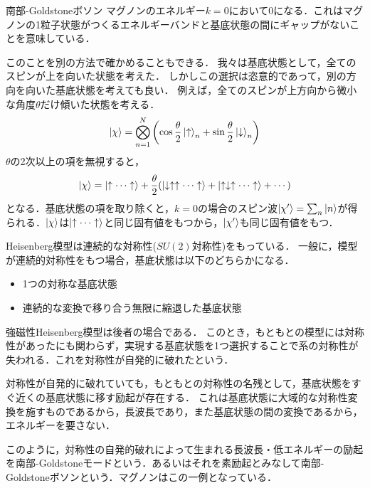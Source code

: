 \documentclass[../main.tex]{subfiles}
\begin{document}
\begin{frame}{南部-Goldstoneボソン}
    マグノンのエネルギー$k=0$において$0$になる．これはマグノンの1粒子状態がつくるエネルギーバンドと基底状態の間に\alert{ギャップがない}ことを意味している．

    このことを別の方法で確かめることもできる．
    我々は基底状態として，全てのスピンが上を向いた状態を考えた．
    しかしこの選択は恣意的であって，別の方向を向いた基底状態を考えても良い．
    例えば，全てのスピンが上方向から微小な角度$\theta$だけ傾いた状態を考える．
    \begin{align}
        \ket{\chi} = \bigotimes_{n=1}^N \qty(\cos\frac{\theta}{2}\ket{\uparrow}_n + \sin \frac{\theta}{2}\ket{\downarrow}_n)
    \end{align}
    $\theta$の2次以上の項を無視すると，
    \begin{align}
        \ket{\chi} = \ket{\uparrow\cdots\uparrow} + \frac{\theta}{2}\qty(\ket{\downarrow\uparrow\uparrow\cdots\uparrow}+ \ket{\uparrow\downarrow\uparrow\cdots\uparrow}+\cdots)
    \end{align}
    となる．基底状態の項を取り除くと，$k=0$の場合のスピン波$\ket{\chi'} = \sum_n \ket{n}$が得られる．$\ket{\chi}$は$\ket{\uparrow\cdots\uparrow}$と同じ固有値をもつから，$\ket{\chi'}$も同じ固有値をもつ．
\end{frame}

\begin{frame}
    Heisenberg模型は連続的な対称性($SU(2)$対称性)をもっている．
    一般に，模型が連続的対称性をもつ場合，基底状態は以下のどちらかになる．
    \begin{itemize}
        \item 1つの対称な基底状態
        \item 連続的な変換で移り合う無限に縮退した基底状態
    \end{itemize}
    強磁性Heisenberg模型は後者の場合である．
    このとき，もともとの模型には対称性があったにも関わらず，実現する基底状態を1つ選択することで系の対称性が失われる．これを\alert{対称性が自発的に破れた}という．

    対称性が自発的に破れていても，もともとの対称性の名残として，基底状態をすぐ近くの基底状態に移す励起が存在する．
    これは基底状態に大域的な対称性変換を施すものであるから，長波長であり，また基底状態の間の変換であるから，エネルギーを要さない．

    このように，対称性の自発的破れによって生まれる長波長・低エネルギーの励起を南部-Goldstoneモードという．あるいはそれを素励起とみなして南部-Goldstoneボソンという．マグノンはこの一例となっている．
\end{frame}
\end{document}

